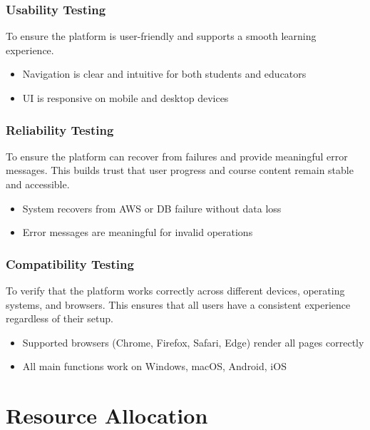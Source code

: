 \documentclass[a4paper,11pt]{scrartcl}
\begin{document}
\subsubsection{Usability Testing}
To ensure the platform is user-friendly and supports a smooth learning experience.
\begin{itemize}[leftmargin=*]
    \item Navigation is clear and intuitive for both students and educators
    \item UI is responsive on mobile and desktop devices
\end{itemize}

\subsubsection{Reliability Testing}
To ensure the platform can recover from failures and provide meaningful error messages. This builds trust that user progress and course content remain stable and accessible.
\begin{itemize}[leftmargin=*]
    \item System recovers from AWS or DB failure without data loss
    \item Error messages are meaningful for invalid operations
\end{itemize}

\subsubsection{Compatibility Testing}
To verify that the platform works correctly across different devices, operating systems, and browsers. This ensures that all users have a consistent experience regardless of their setup.
\begin{itemize}[leftmargin=*]
    \item Supported browsers (Chrome, Firefox, Safari, Edge) render all pages correctly
    \item All main functions work on Windows, macOS, Android, iOS
\end{itemize}

\section{Resource Allocation}
\end{document}
